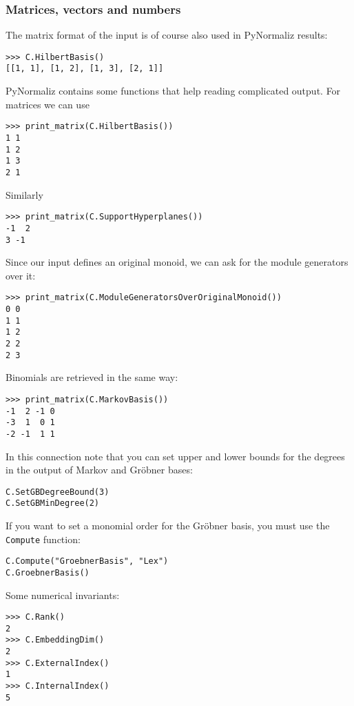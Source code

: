 \begin{small}
\subsubsection{Matrices, vectors and numbers}

The matrix format of the input is of course also used in PyNormaliz results:
\begin{Verbatim}
>>> C.HilbertBasis()
[[1, 1], [1, 2], [1, 3], [2, 1]]
\end{Verbatim}
PyNormaliz contains some functions that help reading complicated output. For matrices we can use
\begin{Verbatim}
>>> print_matrix(C.HilbertBasis())
1 1
1 2
1 3
2 1
\end{Verbatim}
Similarly
\begin{Verbatim}
>>> print_matrix(C.SupportHyperplanes())
-1  2
3 -1
\end{Verbatim}
Since our input defines an original monoid, we can ask for the module generators over it:
\begin{Verbatim}
>>> print_matrix(C.ModuleGeneratorsOverOriginalMonoid())
0 0
1 1
1 2
2 2
2 3
\end{Verbatim}
Binomials are retrieved in the same way:
\begin{Verbatim}
>>> print_matrix(C.MarkovBasis())
-1  2 -1 0
-3  1  0 1
-2 -1  1 1
\end{Verbatim}
In this connection note that you can set upper and lower bounds for the degrees in the output of Markov and Gröbner bases:
\begin{Verbatim}
C.SetGBDegreeBound(3)
C.SetGBMinDegree(2)
\end{Verbatim}
If you want to set a monomial order for the Gröbner basis, you must use the \verb|Compute| function:
\begin{Verbatim}
C.Compute("GroebnerBasis", "Lex")
C.GroebnerBasis()
\end{Verbatim}

Some numerical invariants:
\begin{Verbatim}
>>> C.Rank()
2
>>> C.EmbeddingDim()
2
>>> C.ExternalIndex()
1
>>> C.InternalIndex()
5
\end{Verbatim}


\end{small}
